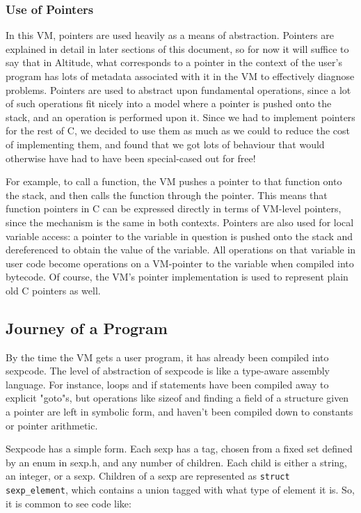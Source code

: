 \documentclass[10pt,a4paper]{report}
\begin{document}
\subsubsection{Use of Pointers}
In this VM, pointers are used heavily as a means of abstraction. Pointers are explained in detail in later sections of this document, so for now it will suffice to say that in Altitude, what corresponds to a pointer in the context of the user's program has lots of metadata associated with it in the VM to effectively diagnose problems. Pointers are used to abstract upon fundamental operations, since a lot of such operations fit nicely into a model where a pointer is pushed onto the stack, and an operation is performed upon it. Since we had to implement pointers for the rest of C, we decided to use them as much as we could to reduce the cost of implementing them, and found that we got lots of behaviour that would otherwise have had to have been special-cased out for free!

For example, to call a function, the VM pushes a pointer to that function onto the stack, and then calls the function through the pointer. This means that function pointers in C can be expressed directly in terms of VM-level pointers, since the mechanism is the same in both contexts. Pointers are also used for local variable access: a pointer to the variable in question is pushed onto the stack and dereferenced to obtain the value of the variable. All operations on that variable in user code become operations on a VM-pointer to the variable when compiled into bytecode. Of course, the VM's pointer implementation is used to represent plain old C pointers as well.

\subsection{Journey of a Program}

By the time the VM gets a user program, it has already been compiled into sexpcode. The level of abstraction of sexpcode is like a type-aware assembly language. For instance, loops and if statements have been compiled away to explicit "goto"s, but operations like sizeof and finding a field of a structure given a pointer are left in symbolic form, and haven't been compiled down to constants or pointer arithmetic.

Sexpcode has a simple form. Each sexp has a tag, chosen from a fixed set defined by an enum in sexp.h, and any number of children. Each child is either a string, an integer, or a sexp. Children of a sexp are represented as \lstinline{struct sexp_element}, which contains a union tagged with what type of element it is. So, it is common to see code like:
\end{document}
